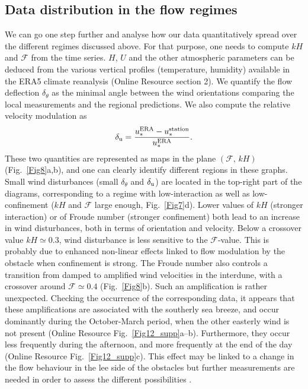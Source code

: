 \subsection{Data distribution in the flow regimes}
We can go one step further and analyse how our data quantitatively spread over the different regimes discussed above. For that purpose, one needs to compute $kH$ and $\mathcal{F}$ from the time series. $H$, $U$ and the other atmospheric parameters can be deduced from the various vertical profiles (temperature, humidity) available in the ERA5 climate reanalysis (Online Resource section 2). We quantify the flow deflection $\delta_{\theta}$ as the minimal angle between the wind orientations comparing the local measurements and the regional predictions. We also compute the relative velocity modulation as
%
\begin{equation}
\delta_{\textup{u}} = \frac{u_{*}^{\textup{ERA}} -  u_{*}^{\textup{station}}}{u_{*}^{\textup{ERA}}}.
\end{equation}
%
These two quantities are represented as maps in the plane $(\mathcal{F}, \, kH)$ (Fig.~\ref{Fig8}a,b), and one can clearly identify different regions in these graphs. Small wind disturbances (small $\delta_{\theta}$ and $\delta_{\textup{u}}$) are located in the top-right part of the diagrams, corresponding to a regime with low-interaction as well as low-confinement ($k H$ and $\mathcal{F}$ large enough, Fig.~\ref{Fig7}d). Lower values of $k H$ (stronger interaction) or of Froude number (stronger confinement) both lead to an increase in wind disturbances, both in terms of orientation and velocity. Below a crossover value $k H \simeq 0.3$, wind disturbance is less sensitive to the $\mathcal{F}$-value. This is probably due to enhanced non-linear effects linked to flow modulation by the obstacle when confinement is strong. The Froude number also controls a transition from damped to amplified wind velocities in the interdune, with a crossover around $\mathcal{F} \simeq 0.4$ (Fig.~\ref{Fig8}b). Such an amplification is rather unexpected. Checking the occurrence of the corresponding data, it appears that these amplifications are associated with the southerly sea breeze, and occur dominantly during the October-March period, when the other easterly wind is not present (Online Resource Fig.~\ref{Fig12_supp}a--b). Furthermore, they occur less frequently during the afternoon, and more frequently at the end of the day (Online Resource Fig.~\ref{Fig12_supp}c). This effect may be linked to a change in the flow behaviour in the lee side of the obstacles but further measurements are needed in order to assess the different possibilities \citep{baines1995, Vosper2004}.


